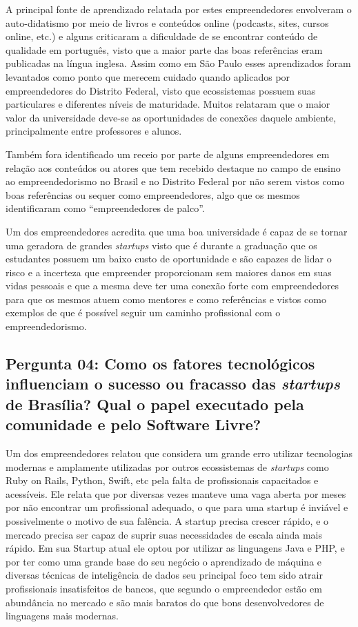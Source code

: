 A principal fonte de aprendizado relatada por estes empreendedores envolveram o auto-didatismo por meio de livros e conteúdos online (podcasts, sites, cursos online, etc.) e alguns criticaram a dificuldade de se encontrar conteúdo de qualidade em português, visto que a maior parte das boas referências eram publicadas na língua inglesa. Assim como em São Paulo esses aprendizados foram levantados como ponto que merecem cuidado quando aplicados por empreendedores do Distrito Federal, visto que ecossistemas possuem suas particulares e diferentes níveis de maturidade. Muitos relataram que o maior valor da universidade deve-se as oportunidades de conexões daquele ambiente, principalmente entre professores e alunos.

Também fora identificado um receio por parte de alguns empreendedores em relação aos conteúdos ou atores que tem recebido destaque no campo de ensino ao empreendedorismo no Brasil e no Distrito Federal por não serem vistos como boas referências ou sequer como empreendedores, algo que os mesmos identificaram como ``empreendedores de palco''.

Um dos empreendedores acredita que uma boa universidade é capaz de se tornar uma geradora de grandes \textit{startups} visto que é durante a graduação que os estudantes possuem um baixo custo de oportunidade e são capazes de lidar o risco e a incerteza que empreender proporcionam sem maiores danos em suas vidas pessoais e que a mesma deve ter uma conexão forte com empreendedores para que os mesmos atuem como mentores e como referências e vistos como exemplos de que é possível seguir um caminho profissional com o empreendedorismo.

\subsection*{Pergunta 04: Como os fatores tecnológicos influenciam o sucesso ou fracasso das \textit{startups} de Brasília? Qual o papel executado pela comunidade e pelo Software Livre?}
\label{subsection:pergunta_de_pesquisa_4}

Um dos empreendedores relatou que considera um grande erro utilizar tecnologias modernas e amplamente utilizadas por outros ecossistemas de \textit{startups} como Ruby on Rails, Python, Swift, etc pela falta de profissionais capacitados e acessíveis. Ele relata que por diversas vezes manteve uma vaga aberta por meses por não encontrar um profissional adequado, o que para uma startup é inviável e possivelmente o motivo de sua falência. A startup precisa crescer rápido, e o mercado precisa ser capaz de suprir suas necessidades de escala ainda mais rápido. Em sua Startup atual ele optou por utilizar as linguagens Java e PHP, e por ter como uma grande base do seu negócio o aprendizado de máquina e diversas técnicas de inteligência de dados seu principal foco tem sido atrair profissionais insatisfeitos de bancos, que segundo o empreendedor estão em abundância no mercado e são mais baratos do que bons desenvolvedores de linguagens mais modernas. 

